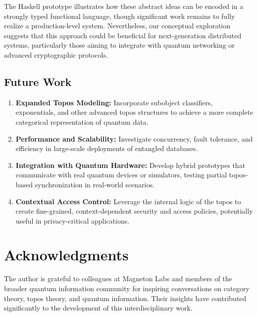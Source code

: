 \documentclass[11pt]{article}
\begin{document}
The Haskell prototype illustrates how these abstract ideas can be encoded in a strongly typed functional language, though significant work remains to fully realize a production-level system. Nevertheless, our conceptual exploration suggests that this approach could be beneficial for next-generation distributed systems, particularly those aiming to integrate with quantum networking or advanced cryptographic protocols.

\subsection{Future Work}
\begin{enumerate}[label=(\roman*)]
    \item \textbf{Expanded Topos Modeling:} Incorporate subobject classifiers, exponentials, and other advanced topos structures to achieve a more complete categorical representation of quantum data.
    \item \textbf{Performance and Scalability:} Investigate concurrency, fault tolerance, and efficiency in large-scale deployments of entangled databases.
    \item \textbf{Integration with Quantum Hardware:} Develop hybrid prototypes that communicate with real quantum devices or simulators, testing partial topos-based synchronization in real-world scenarios.
    \item \textbf{Contextual Access Control:} Leverage the internal logic of the topos to create fine-grained, context-dependent security and access policies, potentially useful in privacy-critical applications.
\end{enumerate}

\section*{Acknowledgments}
The author is grateful to colleagues at Magneton Labs and members of the broader quantum information community for inspiring conversations on category theory, topos theory, and quantum information. Their insights have contributed significantly to the development of this interdisciplinary work.

\newpage
\end{document}
